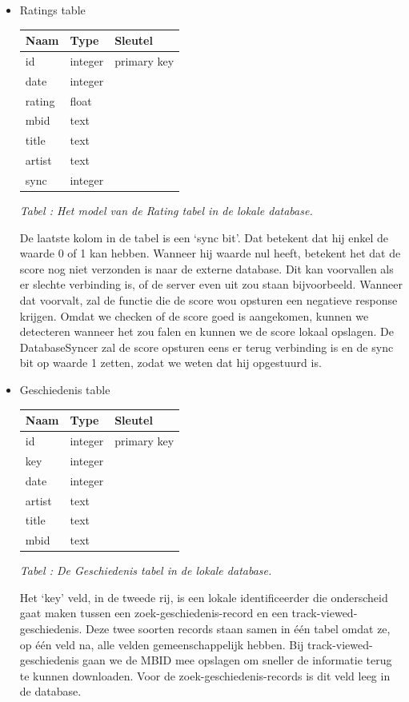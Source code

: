 \documentclass[11pt,a4paper]{article}
\newcounter{tabc}
\newcommand{\increaseTabID} {%
   \stepcounter{tabc}%
   \thetabc}
\newcommand{\tabID}[1]{\small \textit{Tabel \increaseTabID : #1} \\ \normalsize}
\begin{document}
	 \begin{itemize}
		\item Ratings table \newline
		
		\begin{tabular}{| l | l | l | }
		\hline
		 Naam		& Type		& Sleutel		\\
		 \hline 
		 id 		& integer 	& primary key 	\\
		 date 		& integer	& 				\\
		 rating 	& float 	& 				\\
		 mbid 		& text 		& 				\\
		 title 		& text 		& 				\\
		 artist 	& text 		& 				\\
		 sync		& integer 	& 				\\
		 \hline
		\end{tabular} \newline
		\tabID{Het model van de Rating tabel in de lokale database.}  

		De laatste kolom in de tabel is een `sync bit'. Dat betekent dat hij enkel de waarde 0 of 1 kan hebben. Wanneer hij waarde nul heeft, betekent het dat de score nog niet verzonden is naar de externe database. Dit kan voorvallen als er slechte verbinding is, of de server even uit zou staan bijvoorbeeld. Wanneer dat voorvalt, zal de functie die de score wou opsturen een negatieve response krijgen. Omdat we checken of de score goed is aangekomen, kunnen we detecteren wanneer het zou falen en kunnen we de score lokaal opslagen. De DatabaseSyncer zal de score opsturen eens er terug verbinding is en de sync bit op waarde 1 zetten, zodat we weten dat hij opgestuurd is. 
		
		\item Geschiedenis table \\
		
		\begin{tabular}{| l | l | l | }
		\hline
		Naam	& Type		& Sleutel		\\
		\hline
		id 		& integer 	& primary key 	\\
		key		& integer	&				\\
		date 	& integer 	& 				\\
		artist 	& text 		& 				\\
		title 	& text 		& 				\\
		mbid 	& text 		& 				\\
		\hline
		\end{tabular} \newline
		\tabID{De Geschiedenis tabel in de lokale database.} 
	
		Het `key' veld, in de tweede rij, is een lokale identificeerder die onderscheid gaat maken tussen een zoek-geschiedenis-record en een track-viewed-geschiedenis. Deze twee soorten records staan samen in één tabel omdat ze, op één veld na, alle velden gemeenschappelijk hebben. Bij track-viewed-geschiedenis gaan we de MBID mee opslagen om sneller de informatie terug te kunnen downloaden. Voor de zoek-geschiedenis-records is dit veld leeg in de database.
	 \end{itemize}
	
\end{document}
